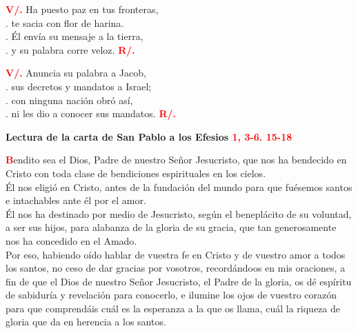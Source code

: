 \documentclass[12pt, letterpaper]{report}
\begin{document}
  {\bfseries \textcolor{red}{V/.}} \hspace{1cm} Ha puesto paz en tus fronteras, \\
  . \hspace{2.3cm} te sacia con flor de harina. \\
  . \hspace{2.3cm} \'El env\'ia su mensaje a la tierra, \\
  . \hspace{2.3cm} y su palabra corre veloz. \hspace{1cm} {\bfseries \textcolor{red}{R/.}}

  {\bfseries \textcolor{red}{V/.}} \hspace{1cm} Anuncia su palabra a Jacob, \\
  . \hspace{2.3cm} sus decretos y mandatos a Israel; \\
  . \hspace{2.3cm} con ninguna naci\'on obr\'o as\'i, \\
  . \hspace{2.3cm} ni les dio a conocer sus mandatos. \hspace{1cm} {\bfseries \textcolor{red}{R/.}}

  \clearpage

  \Large {\bfseries Lectura de la carta de San Pablo a los Efesios \hspace{1cm} \textcolor{red}{1, 3-6. 15-18}}

  \lettrine[lines=2]{\bfseries \textcolor{red}{B}}{}\Large endito sea el Dios, Padre de nuestro Se\~nor Jesucristo, que nos ha bendecido en Cristo con toda clase de bendiciones espirituales en los cielos.\\
  Él nos eligi\'o en Cristo, antes de la fundaci\'on del mundo para que fu\'esemos santos e intachables ante \'el por el amor. \\
  \'El nos ha destinado por medio de Jesucristo, seg\'un el benepl\'acito de su voluntad, a ser sus hijos, para alabanza de la gloria de su gracia, que tan generosamente nos ha concedido en el Amado. \\
  Por eso, habiendo o\'ido hablar de vuestra fe en Cristo y de vuestro amor a todos los santos, no ceso de dar gracias por vosotros, record\'andoos en mis oraciones, a fin de que el Dios de nuestro Se\~nor Jesucristo, el Padre de la gloria, os d\'e esp\'iritu de sabidur\'ia y revelaci\'on para conocerlo, e ilumine los ojos de vuestro coraz\'on para que comprend\'ais cu\'al es la esperanza a la que os llama, cu\'al la riqueza de gloria que da en herencia a los santos.
\end{document}
